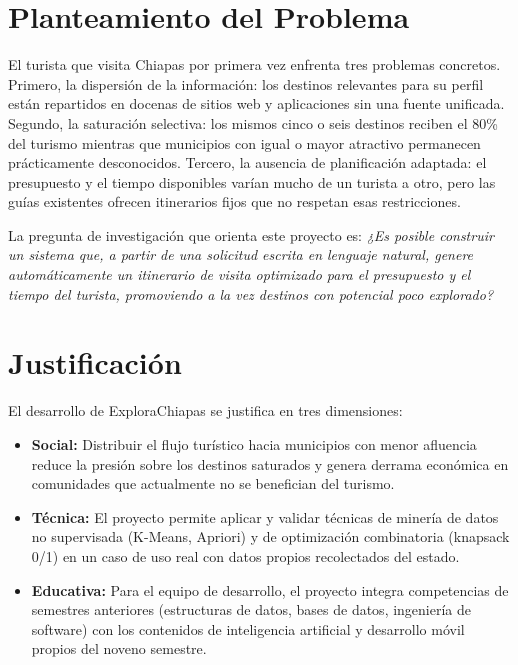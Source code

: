 \documentclass[12pt,letterpaper]{report}
\begin{document}
\section{Planteamiento del Problema}

El turista que visita Chiapas por primera vez enfrenta tres problemas concretos. Primero, la
dispersión de la información: los destinos relevantes para su perfil están repartidos en
docenas de sitios web y aplicaciones sin una fuente unificada. Segundo, la saturación selectiva:
los mismos cinco o seis destinos reciben el 80\% del turismo mientras que municipios con igual
o mayor atractivo permanecen prácticamente desconocidos. Tercero, la ausencia de planificación
adaptada: el presupuesto y el tiempo disponibles varían mucho de un turista a otro, pero las
guías existentes ofrecen itinerarios fijos que no respetan esas restricciones.

La pregunta de investigación que orienta este proyecto es: \textit{¿Es posible construir un
sistema que, a partir de una solicitud escrita en lenguaje natural, genere automáticamente un
itinerario de visita optimizado para el presupuesto y el tiempo del turista, promoviendo a la
vez destinos con potencial poco explorado?}

\section{Justificación}

El desarrollo de ExploraChiapas se justifica en tres dimensiones:

\begin{itemize}[leftmargin=2cm]
  \item \textbf{Social:} Distribuir el flujo turístico hacia municipios con menor afluencia
        reduce la presión sobre los destinos saturados y genera derrama económica en comunidades
        que actualmente no se benefician del turismo.
  \item \textbf{Técnica:} El proyecto permite aplicar y validar técnicas de minería de datos
        no supervisada (K-Means, Apriori) y de optimización combinatoria (knapsack 0/1) en un
        caso de uso real con datos propios recolectados del estado.
  \item \textbf{Educativa:} Para el equipo de desarrollo, el proyecto integra competencias de
        semestres anteriores (estructuras de datos, bases de datos, ingeniería de software) con
        los contenidos de inteligencia artificial y desarrollo móvil propios del noveno semestre.
\end{itemize}
\end{document}
